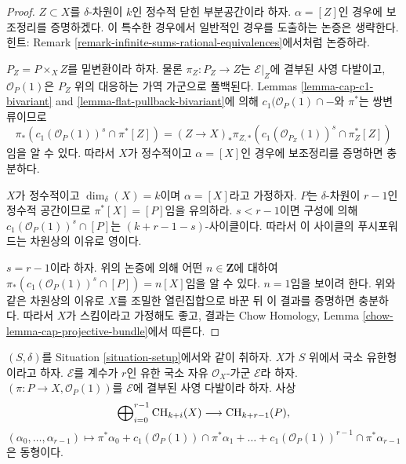 \begin{proof}
$Z \subset X$를 $\delta$-차원이 $k$인 정수적 닫힌 부분공간이라 하자.
$\alpha = [Z]$인 경우에 보조정리를 증명하겠다. 이 특수한 경우에서
일반적인 경우를 도출하는 논증은 생략한다. 힌트: Remark
\ref{remark-infinite-sums-rational-equivalences}에서처럼 논증하라.

\medskip\noindent
$P_Z = P \times_X Z$를 밑변환이라 하자. 물론
$\pi_Z : P_Z \to Z$는 $\mathcal{E}|_Z$에 결부된 사영 다발이고,
$\mathcal{O}_P(1)$은 $P_Z$ 위의 대응하는 가역 가군으로 풀백된다.
Lemmas \ref{lemma-cap-c1-bivariant} and
\ref{lemma-flat-pullback-bivariant}에 의해
$c_1(\mathcal{O}_P(1) \cap -$와 $\pi^*$는 쌍변류이므로
$$
\pi_*\left(
c_1(\mathcal{O}_P(1))^s \cap \pi^*[Z]
\right)
=
(Z \to X)_*\pi_{Z, *}\left(
c_1(\mathcal{O}_{P_Z}(1))^s \cap \pi_Z^*[Z]
\right)
$$
임을 알 수 있다. 따라서 $X$가 정수적이고
$\alpha  = [X]$인 경우에 보조정리를 증명하면 충분하다.

\medskip\noindent
$X$가 정수적이고 $\dim_\delta(X) = k$이며
$\alpha = [X]$라고 가정하자.
$P$는 $\delta$-차원이 $r - 1$인 정수적 공간이므로
$\pi^*[X] = [P]$임을 유의하라.
$s < r - 1$이면 구성에 의해
$c_1(\mathcal{O}_P(1))^s \cap [P]$는
$(k + r - 1 - s)$-사이클이다.
따라서 이 사이클의 푸시포워드는 차원상의 이유로 영이다.

\medskip\noindent
$s = r - 1$이라 하자. 위의 논증에 의해 어떤
$n \in \mathbf{Z}$에 대하여
$\pi_*(c_1(\mathcal{O}_P(1))^s \cap [P]) = n [X]$임을 알 수 있다.
$n = 1$임을 보이려 한다. 위와 같은 차원상의 이유로
$X$를 조밀한 열린집합으로 바꾼 뒤 이 결과를 증명하면 충분하다.
따라서 $X$가 스킴이라고 가정해도 좋고, 결과는 Chow Homology, Lemma
\ref{chow-lemma-cap-projective-bundle}에서 따른다.
\end{proof}

\begin{lemma}[사영공간 다발 공식]
\label{lemma-chow-ring-projective-bundle}
$(S, \delta)$를 Situation \ref{situation-setup}에서와 같이 취하자.
$X$가 $S$ 위에서 국소 유한형이라고 하자.
$\mathcal{E}$를 계수가 $r$인 유한 국소 자유
$\mathcal{O}_X$-가군 $\mathcal{E}$라 하자.
$(\pi : P \to X, \mathcal{O}_P(1))$를
$\mathcal{E}$에 결부된 사영 다발이라 하자. 사상
$$
\bigoplus\nolimits_{i = 0}^{r - 1}
\mathop{\mathrm{CH}}\nolimits_{k + i}(X)
\longrightarrow
\mathop{\mathrm{CH}}\nolimits_{k + r - 1}(P),
$$
$$
(\alpha_0, \ldots, \alpha_{r-1})
\longmapsto
\pi^*\alpha_0 +
c_1(\mathcal{O}_P(1)) \cap \pi^*\alpha_1
+ \ldots +
c_1(\mathcal{O}_P(1))^{r - 1} \cap \pi^*\alpha_{r-1}
$$
은 동형이다.
\end{lemma}

